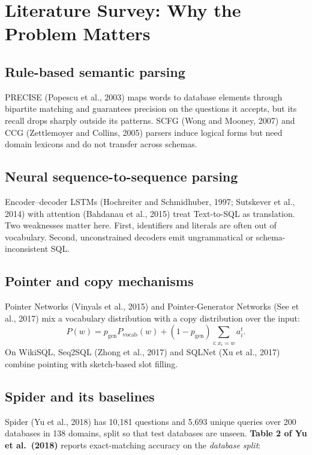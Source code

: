 \documentclass[
  10pt,
]{article}
\begin{document}
\section{Literature Survey: Why the Problem
Matters}\label{literature-survey-why-the-problem-matters}

\subsection{Rule-based semantic
parsing}\label{rule-based-semantic-parsing}

PRECISE (Popescu et al., 2003) maps words to database elements through
bipartite matching and guarantees precision on the questions it accepts,
but its recall drops sharply outside its patterns. SCFG (Wong and
Mooney, 2007) and CCG (Zettlemoyer and Collins, 2005) parsers induce
logical forms but need domain lexicons and do not transfer across
schemas.

\subsection{Neural sequence-to-sequence
parsing}\label{neural-sequence-to-sequence-parsing}

Encoder--decoder LSTMs (Hochreiter and Schmidhuber, 1997; Sutskever et
al., 2014) with attention (Bahdanau et al., 2015) treat Text-to-SQL as
translation. Two weaknesses matter here. First, identifiers and literals
are often out of vocabulary. Second, unconstrained decoders emit
ungrammatical or schema-inconsistent SQL.

\subsection{Pointer and copy
mechanisms}\label{pointer-and-copy-mechanisms}

Pointer Networks (Vinyals et al., 2015) and Pointer-Generator Networks
(See et al., 2017) mix a vocabulary distribution with a copy
distribution over the input:
\[P(w)=p_{\text{gen}}P_{\text{vocab}}(w)+(1-p_{\text{gen}})\sum_{i:x_i=w}a^t_i .\]
On WikiSQL, Seq2SQL (Zhong et al., 2017) and SQLNet (Xu et al., 2017)
combine pointing with sketch-based slot filling.

\subsection{Spider and its baselines}\label{spider-and-its-baselines}

Spider (Yu et al., 2018) has 10,181 questions and 5,693 unique queries
over 200 databases in 138 domains, split so that test databases are
unseen. \textbf{Table 2 of Yu et al.~(2018)} reports exact-matching
accuracy on the \emph{database split}:
\end{document}
